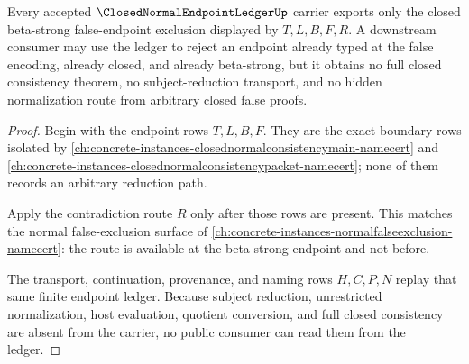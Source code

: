 \begin{theorem}
\label{thm:closed-normal-endpoint-ledger-normal-boundary}
Every accepted $\ClosedNormalEndpointLedgerUp$ carrier exports only the closed beta-strong false-endpoint exclusion displayed by $T,L,B,F,R$. A downstream consumer may use the ledger to reject an endpoint already typed at the false encoding, already closed, and already beta-strong, but it obtains no full closed consistency theorem, no subject-reduction transport, and no hidden normalization route from arbitrary closed false proofs.
\end{theorem}
\begin{proof}
Begin with the endpoint rows $T,L,B,F$. They are the exact boundary rows isolated by \autoref{ch:concrete-instances-closednormalconsistencymain-namecert} and \autoref{ch:concrete-instances-closednormalconsistencypacket-namecert}; none of them records an arbitrary reduction path.

Apply the contradiction route $R$ only after those rows are present. This matches the normal false-exclusion surface of \autoref{ch:concrete-instances-normalfalseexclusion-namecert}: the route is available at the beta-strong endpoint and not before.

The transport, continuation, provenance, and naming rows $H,C,P,N$ replay that same finite endpoint ledger. Because subject reduction, unrestricted normalization, host evaluation, quotient conversion, and full closed consistency are absent from the carrier, no public consumer can read them from the ledger.
\end{proof}


\begin{closurestatus}{\ClosedNormalEndpointLedgerUp}
  \theoryclosure{\seedClosure}
  \formalstatus{\unformalizedV}
\end{closurestatus}
